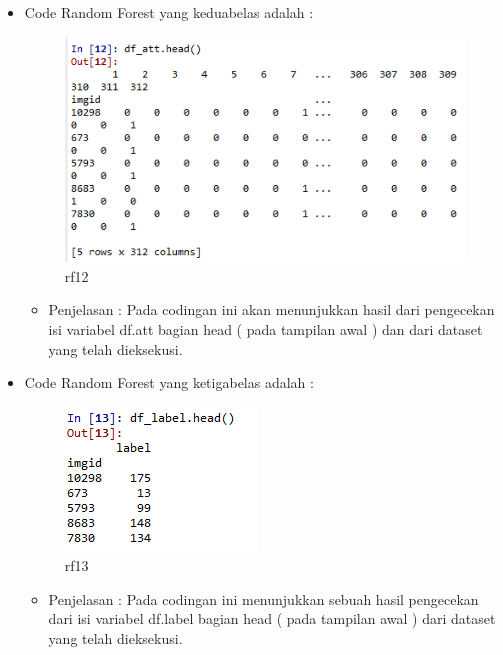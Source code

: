 \begin{enumerate}
\begin{itemize}
\begin{itemize}
\par
\par
\end{itemize}
\item Code Random Forest yang keduabelas adalah :
\par
\begin{figure}[ht]
\centering
\includegraphics[scale=0.4]{figures/rf12.png}
\caption{rf12}
\label{contoh}
\end{figure}
\par
\begin{itemize}
\item Penjelasan : Pada codingan ini akan menunjukkan hasil dari pengecekan isi variabel df.att bagian head ( pada tampilan awal ) dan dari dataset yang telah dieksekusi.
\par
\par
\end{itemize}
\item Code Random Forest yang ketigabelas adalah :
\par
\begin{figure}[ht]
\centering
\includegraphics[scale=0.4]{figures/rf13.png}
\caption{rf13}
\label{contoh}
\end{figure}
\par
\begin{itemize}
\item Penjelasan : Pada codingan ini menunjukkan sebuah hasil pengecekan dari isi variabel df.label bagian head ( pada tampilan awal ) dari dataset yang telah dieksekusi.

\end{itemize}
\end{itemize}
\end{enumerate}
